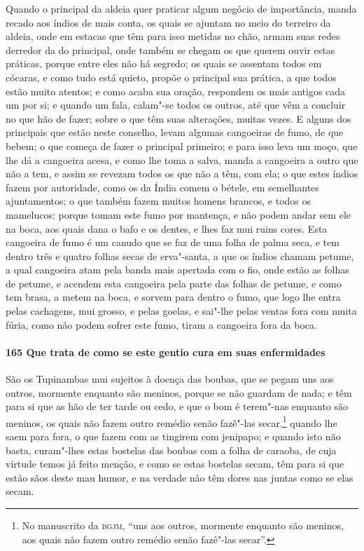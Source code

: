 Quando o principal da aldeia quer praticar algum negócio de importância, manda recado aos
índios de mais conta, os quais se ajuntam no meio do terreiro da aldeia, onde em estacas
que têm para isso metidas no chão, armam suas redes derredor da do principal, onde também
se chegam os que querem ouvir estas práticas, porque entre eles não há segredo; os quais
se assentam todos em cócaras, e como tudo está quieto, propõe o principal sua prática, a
que todos estão muito atentos; e como acaba sua oração, respondem os mais antigos cada um
por si; e quando um fala, calam"-se todos os outros, até que vêm a concluir no que hão de
fazer; sobre o que têm suas alterações, muitas vezes. E alguns dos principais que estão
neste conselho, levam algumas cangoeiras de fumo, de que bebem; o que começa de fazer o
principal primeiro; e para isso leva um moço, que lhe dá a cangoeira acesa, e como lhe
toma a salva, manda a cangoeira a outro que não a tem, e assim se revezam todos os que não
a têm, com ela; o que estes índios fazem por autoridade, como os da Índia comem o bétele,
em semelhantes ajuntamentos; o que também fazem muitos homens brancos, e todos os
mamelucos; porque tomam este fumo por mantença, e não podem andar sem ele na boca, aos
quais dana o bafo e os dentes, e lhes faz mui ruins cores. Esta cangoeira de fumo é um
canudo que se faz de uma folha de palma seca, e tem dentro três e quatro folhas secas de
erva"-santa, a que os índios chamam petume, a qual cangoeira atam pela banda mais apertada
com o fio, onde estão as folhas de petume, e acendem esta cangoeira pela parte das folhas
de petume, e como tem brasa, a metem na boca, e sorvem para dentro o fumo, que logo lhe
entra pelas cachagens, mui grosso, e pelas goelas, e sai"-lhe pelas ventas fora com muita
fúria, como não podem sofrer este fumo, tiram a cangoeira fora da boca.

\paragraph{165 Que trata de como se este gentio cura em suas \mbox{enfermidades}}

São os Tupinambas mui sujeitos à doença das boubas, que se pegam uns aos outros, mormente
enquanto são meninos, porque se não guardam de nada; e têm para si que as hão de ter tarde
ou cedo, e que o bom é terem"-nas enquanto são meninos, os quais não fazem outro remédio
senão fazê"-las secar,\footnote{ No manuscrito da \textsc{bgjm}, ``uns aos outros, mormente
enquanto são meninos, aos quais não fazem outro remédio senão fazê"-las secar''.} quando
lhe saem para fora, o que fazem com as tingirem com jenipapo; e quando isto não basta,
curam"-lhes estas bostelas das boubas com a folha de caraoba, de cuja virtude temos já
feito menção, e como se estas bostelas secam, têm para si que estão sãos deste mau humor,
e na verdade não têm dores nas juntas como se elas secam.

